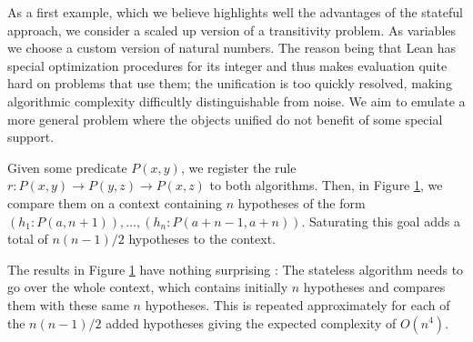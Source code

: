 \documentclass[runningheads]{llncs}
\begin{document}
\begin{figure}
    \label{fig:trans}
    \end{figure}

As a first example, which we believe highlights well the advantages of the stateful approach, we consider a scaled up version of a transitivity problem.
As variables we choose a custom version of natural numbers.
The reason being that Lean has special optimization procedures for its integer and thus makes evaluation quite hard on problems that use them; the unification is too quickly resolved, making algorithmic complexity difficultly distinguishable from noise.
We aim to emulate a more general problem where the objects unified do not benefit of some special support.

Given some predicate $P(x, y)$, we register the rule $r : P(x, y) \to P(y, z) \to P(x, z)$ to both algorithms.
Then, in Figure \ref{fig:trans}, we compare them on a context containing $n$ hypotheses of the form $(h_1 : P(a, n + 1)), \dots, (h_n : P(a + n - 1, a + n))$.
Saturating this goal adds a total of $n(n-1)/2$ hypotheses to the context.

The results in Figure \ref{fig:trans} have nothing surprising : The stateless algorithm needs to go over the whole context, which contains initially $n$ hypotheses and compares them with these same $n$ hypotheses.
This is repeated approximately for each of the $n(n-1)/2$ added hypotheses giving the expected complexity of $O(n^4)$.
\end{document}
